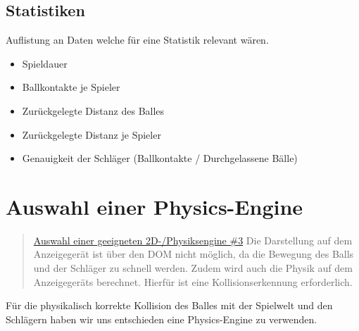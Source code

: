 \subsection{Statistiken}
Auflistung an Daten welche für eine Statistik relevant wären.
\begin{itemize}
	\item
	      Spieldauer
	\item
	      Ballkontakte je Spieler
	\item
	      Zurückgelegte Distanz des Balles
	\item
	      Zurückgelegte Distanz je Spieler
	\item
	      Genauigkeit der Schläger
	      \newline
	      (Ballkontakte / Durchgelassene Bälle)
\end{itemize}
\newpage
\section{Auswahl einer Physics-Engine}

\begin{quote}
	\href{https://github.com/Transport-Protocol/MBC-Ping-Pong/issues/3}{Auswahl einer geeigneten 2D-/Physiksengine \#3}
	\newline
	Die Darstellung auf dem Anzeigegerät ist über den DOM nicht möglich, da die Bewegung des Balls und der Schläger zu schnell werden. Zudem wird auch die Physik auf dem Anzeigegeräts berechnet. Hierfür ist eine Kollisionserkennung erforderlich.
\end{quote}
Für die physikalisch korrekte Kollision des Balles mit der Spielwelt und den Schlägern haben wir uns entschieden eine Physics-Engine zu verwenden.

